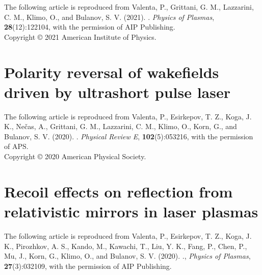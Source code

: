 \documentclass[10pt, a4paper, twoside, openright]{report}
\newcommand{\link}[3][blue]{\href{#2}{\color{#1}{#3}}}%
\begin{document}
The following article is reproduced from Valenta, P., Grittani, G. M., Lazzarini, C. M., Klimo, O., and Bulanov, S. V. (2021). \link{https://doi.org/10.1063/5.0065167}{On the electromagnetic-electron rings originating from the interaction of high-power short-pulse laser and underdense plasma}. \textit{Physics of Plasmas}, \textbf{28}(12):122104, with the permission of AIP Publishing. \\

\noindent Copyright {\copyright} {2021} {American Institute of Physics}.

\newpage
\thispagestyle{empty}
\mbox{}



\newpage
\thispagestyle{empty}
\mbox{}




\newpage
\section{Polarity reversal of wakefields driven by ultrashort pulse laser\label{sec:paper_2}}

The following article is reproduced from Valenta, P., Esirkepov, T. Z., Koga, J. K., Nečas, A., Grittani, G. M., Lazzarini, C. M., Klimo, O., Korn, G., and Bulanov, S. V. (2020). \link{https://doi.org/10.1103/PhysRevE.102.053216}{Polarity reversal of wakefields driven by ultrashort pulse laser}. \textit{Physical Review E}, \textbf{102}(5):053216, with the permission of APS. \\

\noindent Copyright {\copyright} {2020} {American Physical Society}.

\newpage
\mbox{}
\thispagestyle{empty}

\newpage


\mbox{}
\thispagestyle{empty}
\newpage

\section{Recoil effects on reflection from relativistic mirrors in laser plasmas\label{sec:paper_3}}

The following article is reproduced from Valenta, P., Esirkepov, T. Z., Koga, J. K., Pirozhkov, A. S., Kando, M., Kawachi, T., Liu, Y. K., Fang, P., Chen, P., Mu, J., Korn, G., Klimo, O., and Bulanov, S. V. (2020). \link{https://doi.org/10.1063/1.5142084}{Recoil effects on reflection from relativistic mirrors in laser plasmas}., \textit{Physics of Plasmas}, \textbf{27}(3):032109, with the permission of AIP Publishing. \\
\end{document}
